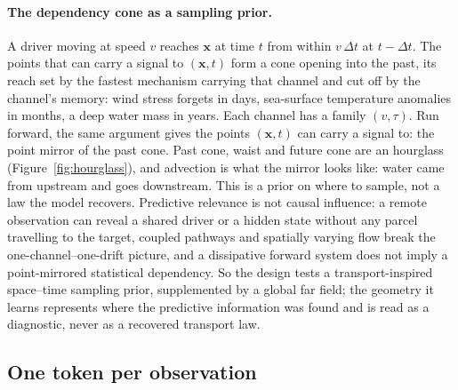 \documentclass[10pt]{article}
\begin{document}
\paragraph{The dependency cone as a sampling prior.} A driver moving at speed
$v$ reaches $\mathbf{x}$ at time $t$ from within $v\,\Delta t$ at
$t-\Delta t$. The points that can carry a signal to $(\mathbf{x},t)$ form a
cone opening into the past, its reach set by the fastest mechanism carrying
that channel and cut off by the channel's memory: wind stress forgets in
days, sea-surface temperature anomalies in months, a deep water mass in
years. Each channel has a family $(v,\tau)$. Run forward, the same argument
gives the points $(\mathbf{x},t)$ can carry a signal to: the point mirror of
the past cone. Past cone, waist and future cone are an hourglass
(Figure~\ref{fig:hourglass}), and advection is what the mirror looks like:
water came from upstream and goes downstream. This is a prior on where to
sample, not a law the model recovers. Predictive relevance is not causal
influence: a remote observation can reveal a shared driver or a hidden state
without any parcel travelling to the target, coupled pathways and
spatially varying flow break the one-channel--one-drift picture, and a
dissipative forward system does not imply a point-mirrored statistical
dependency. So the design tests a transport-inspired space--time sampling
prior, supplemented by a global far field; the geometry it learns represents
where the predictive information was found and is read as a diagnostic, never
as a recovered transport law.

\subsection{One token per observation}\label{sec:data-token}
\end{document}
